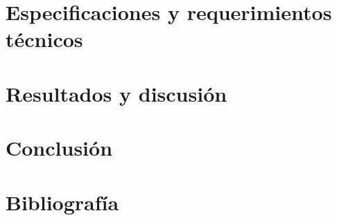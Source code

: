 \documentclass[a4paper,11pt]{article}
\begin{document}
\newpage
\section{Especificaciones y requerimientos técnicos}


\newpage
\section{Resultados y discusión}


\newpage
\section{Conclusión}


\newpage
\section{Bibliografía}

\end{document}
